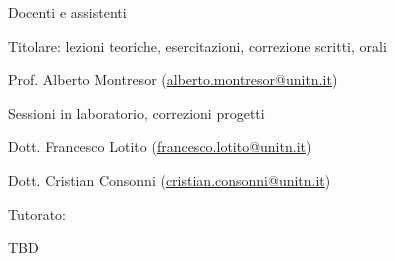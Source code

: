 \begin{frame}{Docenti e assistenti}
	
\BIL
\item Titolare: lezioni teoriche, esercitazioni, correzione scritti, orali
\BI
\item Prof. Alberto Montresor (\underline{alberto.montresor@unitn.it})
\EI
\item Sessioni in laboratorio, correzioni progetti
\BI
\item Dott. Francesco Lotito (\underline{francesco.lotito@unitn.it})
\item Dott. Cristian Consonni (\underline{cristian.consonni@unitn.it})
\EI
\item Tutorato:
\BI
\item TBD
\EI
\EIL
\end{frame}

